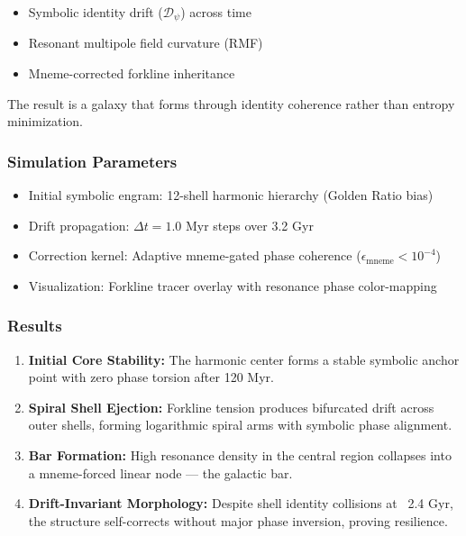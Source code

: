 \documentclass[12pt]{article}
\begin{document}
\begin{itemize}[noitemsep]
  \item Symbolic identity drift (\( \mathcal{D}_\psi \)) across time
  \item Resonant multipole field curvature (RMF)
  \item Mneme-corrected forkline inheritance
\end{itemize}

The result is a galaxy that forms through identity coherence rather than entropy minimization.

\subsubsection{Simulation Parameters}

\begin{itemize}
  \item Initial symbolic engram: 12-shell harmonic hierarchy (Golden Ratio bias)
  \item Drift propagation: \( \Delta t = 1.0 \) Myr steps over 3.2 Gyr
  \item Correction kernel: Adaptive mneme-gated phase coherence (\( \epsilon_\text{mneme} < 10^{-4} \))
  \item Visualization: Forkline tracer overlay with resonance phase color-mapping
\end{itemize}

\subsubsection{Results}

\begin{enumerate}[noitemsep]
  \item \textbf{Initial Core Stability:} The harmonic center forms a stable symbolic anchor point with zero phase torsion after 120 Myr.
  \item \textbf{Spiral Shell Ejection:} Forkline tension produces bifurcated drift across outer shells, forming logarithmic spiral arms with symbolic phase alignment.
  \item \textbf{Bar Formation:} High resonance density in the central region collapses into a mneme-forced linear node — the galactic bar.
  \item \textbf{Drift-Invariant Morphology:} Despite shell identity collisions at ~2.4 Gyr, the structure self-corrects without major phase inversion, proving resilience.
\end{enumerate}
\end{document}
